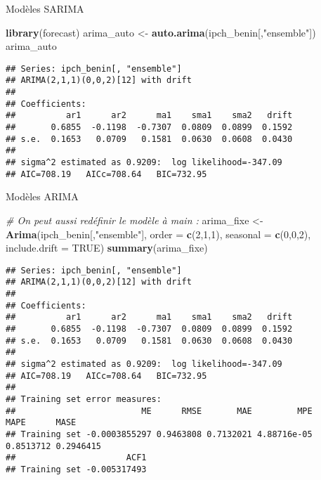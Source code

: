\documentclass[10pt,xcolor=table,color={dvipsnames,usenames},ignorenonframetext,usepdftitle=false,french]{beamer}
\newenvironment{Shaded}{\begin{snugshade}}{\end{snugshade}}
\newcommand{\CommentTok}[1]{\textcolor[rgb]{0.56,0.35,0.01}{\textit{#1}}}
\newcommand{\DataTypeTok}[1]{\textcolor[rgb]{0.13,0.29,0.53}{#1}}
\newcommand{\DecValTok}[1]{\textcolor[rgb]{0.00,0.00,0.81}{#1}}
\newcommand{\KeywordTok}[1]{\textcolor[rgb]{0.13,0.29,0.53}{\textbf{#1}}}
\newcommand{\NormalTok}[1]{#1}
\newcommand{\OtherTok}[1]{\textcolor[rgb]{0.56,0.35,0.01}{#1}}
\newcommand{\StringTok}[1]{\textcolor[rgb]{0.31,0.60,0.02}{#1}}
\begin{document}
\begin{frame}[fragile]{Modèles SARIMA}
\protect\hypertarget{moduxe8les-sarima-1}{}

\begin{Shaded}
\begin{Highlighting}[]
\KeywordTok{library}\NormalTok{(forecast)}
\NormalTok{arima_auto <-}\StringTok{ }\KeywordTok{auto.arima}\NormalTok{(ipch_benin[,}\StringTok{"ensemble"}\NormalTok{])}
\NormalTok{arima_auto}
\end{Highlighting}
\end{Shaded}

\begin{verbatim}
## Series: ipch_benin[, "ensemble"] 
## ARIMA(2,1,1)(0,0,2)[12] with drift 
## 
## Coefficients:
##          ar1      ar2      ma1    sma1    sma2   drift
##       0.6855  -0.1198  -0.7307  0.0809  0.0899  0.1592
## s.e.  0.1653   0.0709   0.1581  0.0630  0.0608  0.0430
## 
## sigma^2 estimated as 0.9209:  log likelihood=-347.09
## AIC=708.19   AICc=708.64   BIC=732.95
\end{verbatim}

\end{frame}

\begin{frame}[fragile]{Modèles ARIMA}
\protect\hypertarget{moduxe8les-arima}{}

\begin{Shaded}
\begin{Highlighting}[]
\CommentTok{# On peut aussi redéfinir le modèle à main :}
\NormalTok{arima_fixe <-}\StringTok{ }\KeywordTok{Arima}\NormalTok{(ipch_benin[,}\StringTok{"ensemble"}\NormalTok{],}
                    \DataTypeTok{order =} \KeywordTok{c}\NormalTok{(}\DecValTok{2}\NormalTok{,}\DecValTok{1}\NormalTok{,}\DecValTok{1}\NormalTok{), }\DataTypeTok{seasonal =} \KeywordTok{c}\NormalTok{(}\DecValTok{0}\NormalTok{,}\DecValTok{0}\NormalTok{,}\DecValTok{2}\NormalTok{),}
                    \DataTypeTok{include.drift =} \OtherTok{TRUE}\NormalTok{)}
\KeywordTok{summary}\NormalTok{(arima_fixe)}
\end{Highlighting}
\end{Shaded}

\begin{verbatim}
## Series: ipch_benin[, "ensemble"] 
## ARIMA(2,1,1)(0,0,2)[12] with drift 
## 
## Coefficients:
##          ar1      ar2      ma1    sma1    sma2   drift
##       0.6855  -0.1198  -0.7307  0.0809  0.0899  0.1592
## s.e.  0.1653   0.0709   0.1581  0.0630  0.0608  0.0430
## 
## sigma^2 estimated as 0.9209:  log likelihood=-347.09
## AIC=708.19   AICc=708.64   BIC=732.95
## 
## Training set error measures:
##                         ME      RMSE       MAE         MPE      MAPE      MASE
## Training set -0.0003855297 0.9463808 0.7132021 4.88716e-05 0.8513712 0.2946415
##                      ACF1
## Training set -0.005317493
\end{verbatim}

\end{frame}
\end{document}
